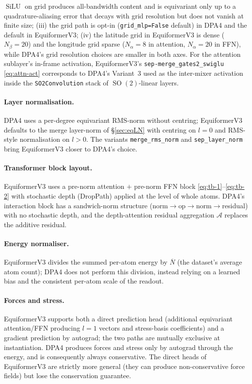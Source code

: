 \documentclass[11pt,a4paper]{article}
\DeclareMathOperator{\SO}{SO}
\DeclareMathOperator{\SiLU}{SiLU}
\theoremstyle{plain}
\theoremstyle{definition}
\theoremstyle{remark}
\begin{document}
$\SiLU$ on grid produces all-bandwidth content and is equivariant only up to a
quadrature-aliasing error that decays with grid resolution but does not vanish
at finite size; (iii) the grid path is opt-in (\texttt{grid\_mlp=False}
default) in DPA4 and the default in EquiformerV3; (iv) the latitude grid in
EquiformerV3 is dense ($N_\beta=20$) and the longitude grid sparse
($N_\alpha=8$ in attention, $N_\alpha=20$ in FFN), while DPA4's grid resolution
choices are smaller in both axes. For the attention sublayer's in-frame
activation, EquiformerV3's \texttt{sep-merge\_gates2\_swiglu}
\eqref{eq:attn-act} corresponds to DPA4's Variant~3 used as the inter-mixer
activation inside the \texttt{SO2Convolution} stack of $\SO(2)$-linear layers.

\paragraph{Layer normalisation.}
DPA4 uses a per-degree equivariant RMS-norm without centring; EquiformerV3
defaults to the merge layer-norm of \S\ref{sec:eqLN} with centring on $l=0$ and
RMS-style normalisation on $l>0$. The variants \texttt{merge\_rms\_norm} and
\texttt{sep\_layer\_norm} bring EquiformerV3 closer to DPA4's choice.

\paragraph{Transformer block layout.}
EquiformerV3 uses a pre-norm attention $+$ pre-norm FFN block
\eqref{eq:tb-1}--\eqref{eq:tb-2} with stochastic depth (DropPath) applied at
the level of whole atoms. DPA4's interaction block has a sandwich-norm
structure (norm$\to$op$\to$norm$\to$residual) with no stochastic depth, and the
depth-attention residual aggregation $\mathcal{A}$ replaces the additive
residual.

\paragraph{Energy normaliser.}
EquiformerV3 divides the summed per-atom energy by $\overline N$ (the dataset's
average atom count); DPA4 does not perform this division, instead relying on a
learned bias and the consistent per-atom scale of the readout.

\paragraph{Forces and stress.}
EquiformerV3 supports both a direct prediction head (additional equivariant
attention/FFN producing $l=1$ vectors and stress-basis coefficients) and a
gradient prediction by autograd; the two paths are mutually exclusive at
instantiation. DPA4 produces forces and stress only by autograd through the
energy, and is consequently always conservative. The direct heads of
EquiformerV3 are strictly more general (they can produce non-conservative force
fields) but lose the conservation guarantee.
\end{document}
